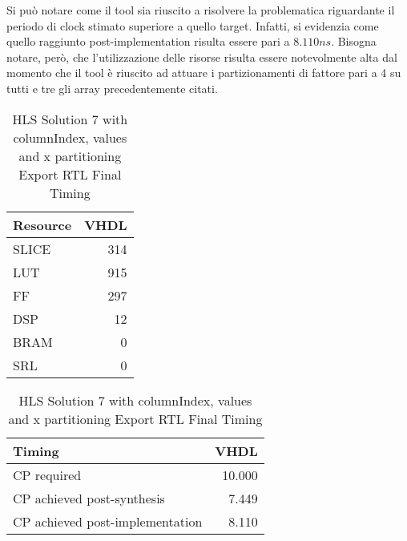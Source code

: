 Si può notare come il tool sia riuscito a risolvere la problematica riguardante il periodo di clock stimato superiore a quello target. Infatti, si evidenzia come quello raggiunto post-implementation risulta essere pari a $8.110 ns$. Bisogna notare, però, che l'utilizzazione delle risorse risulta essere notevolmente alta dal momento che il tool è riuscito ad attuare i partizionamenti di fattore pari a 4 su tutti e tre gli array precedentemente citati.

\begin{table}[H]
	\centering
	\begin{minipage}[t]{0.45\linewidth}
		\centering
		\begin{tabular}{|l|r|}
			\hline
			\textbf{Resource} & \textbf{VHDL} \\
			\hline
			SLICE & 314 \\
			\hline
			LUT & 915 \\
			\hline
			FF & 297 \\
			\hline
			DSP & 12 \\
			\hline
			BRAM & 0 \\
			\hline
			SRL & 0 \\
			\hline
		\end{tabular}
		\caption{HLS Solution 7 with columnIndex, values and x partitioning Export RTL Resource Usage}
		\label{tab:hls-solution-7-columnindex-values-x-partitioning-export-rtl-resoruce-usage}
	\end{minipage}
	\hfill
	\begin{minipage}[t]{0.45\linewidth}
		\centering
		\begin{tabular}{|l|r|}
			\hline
			\textbf{Timing} & \textbf{VHDL} \\
			\hline
			CP required & 10.000 \\
			\hline
			CP achieved post-synthesis & 7.449 \\
			\hline
			CP achieved post-implementation & 8.110 \\
			\hline
		\end{tabular}
		\caption{HLS Solution 7 with columnIndex, values and x partitioning Export RTL Final Timing}
		\label{tab:hls-solution-7-columnindex-values-x-partitioning-export-rtl-final-timing}
	\end{minipage}
\end{table}
